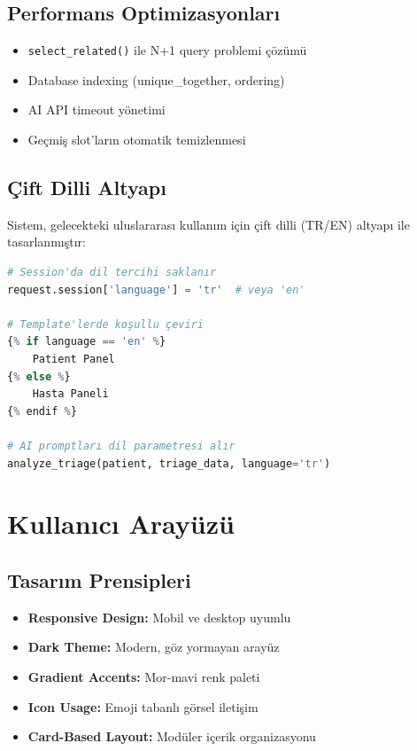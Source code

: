 \documentclass[12pt,a4paper]{article}
\begin{document}
\subsection{Performans Optimizasyonları}

\begin{itemize}
    \item \texttt{select\_related()} ile N+1 query problemi çözümü
    \item Database indexing (unique\_together, ordering)
    \item AI API timeout yönetimi
    \item Geçmiş slot'ların otomatik temizlenmesi
\end{itemize}

\subsection{Çift Dilli Altyapı}

Sistem, gelecekteki uluslararası kullanım için çift dilli (TR/EN) altyapı ile tasarlanmıştır:

\begin{lstlisting}[language=Python, caption=Dil Yönetimi]
# Session'da dil tercihi saklanır
request.session['language'] = 'tr'  # veya 'en'

# Template'lerde koşullu çeviri
{% if language == 'en' %}
    Patient Panel
{% else %}
    Hasta Paneli
{% endif %}

# AI promptları dil parametresi alır
analyze_triage(patient, triage_data, language='tr')
\end{lstlisting}

\section{Kullanıcı Arayüzü}

\subsection{Tasarım Prensipleri}
\begin{itemize}
    \item \textbf{Responsive Design:} Mobil ve desktop uyumlu
    \item \textbf{Dark Theme:} Modern, göz yormayan arayüz
    \item \textbf{Gradient Accents:} Mor-mavi renk paleti
    \item \textbf{Icon Usage:} Emoji tabanlı görsel iletişim
    \item \textbf{Card-Based Layout:} Modüler içerik organizasyonu
\end{itemize}
\end{document}

